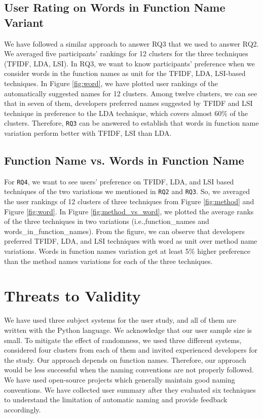 \subsection{User Rating on Words in Function Name Variant}
We have followed a similar approach to answer RQ3 that we used to answer RQ2. We averaged five participants' rankings for 12 clusters for the three techniques (TFIDF, LDA, LSI). In RQ3, we want to know participants' preference when we consider words in the function names as unit for the TFIDF, LDA, LSI-based techniques. In Figure \ref{fig:word}, we have plotted user rankings of the automatically suggested names for 12 clusters. Among twelve clusters, we can see that in seven of them, developers preferred names suggested by TFIDF and LSI technique in preference to the LDA technique, which covers almost 60\% of the clusters. Therefore, \texttt{RQ3} can be answered to establish that words in function name variation perform better with TFIDF, LSI than LDA.      


\subsection{Function Name vs. Words in Function Name}
For \texttt{RQ4}, we want to see users' preference on TFIDF, LDA, and LSI based techniques of the two variations we mentioned in \texttt{RQ2} and \texttt{RQ3}.
So, we averaged the user rankings of 12 clusters of three techniques from Figure \ref{fig:method} and Figure \ref{fig:word}. In Figure \ref{fig:method_vs_word}, we plotted the average ranks of the three techniques in two variations (i.e.,function\_names and  words\_in\_function\_names). From the figure, we can observe that developers preferred TFIDF, LDA, and LSI techniques with word as unit over method name variations. Words in function names variation get at least 5\% higher preference than the method names variations for each of the three techniques. 


\section{Threats to Validity}
We have used three subject systems for the user study, and all of them are written with the Python language. We acknowledge that our user sample size is small. To mitigate the effect of randomness, we used three different systems, considered four clusters from each of them and invited experienced developers for the study. Our approach depends on function names. Therefore, our approach would be less successful when the naming conventions are not properly followed. We have used open-source projects which generally maintain good naming conventions.  We have collected user summary after they evaluated six techniques to understand the limitation of automatic naming and provide feedback accordingly.  
